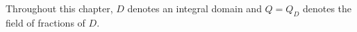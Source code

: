 Throughout this chapter, $D$ denotes an integral domain and $Q=Q_D$ denotes the field of fractions of $D$.